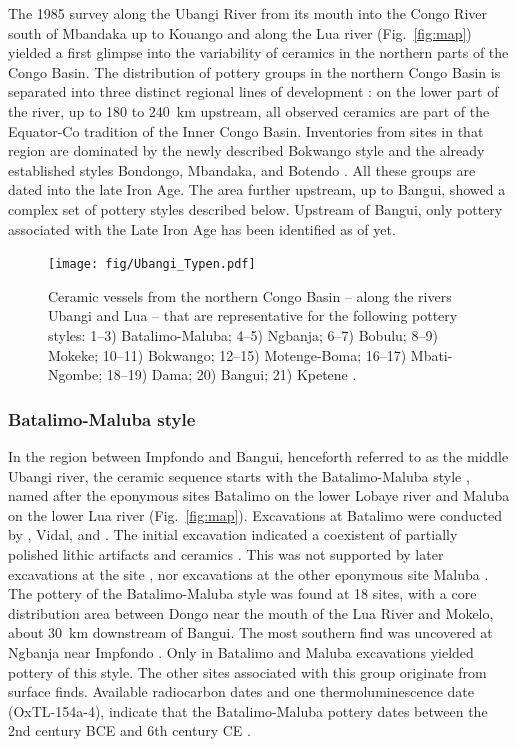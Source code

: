 \documentclass[smallextended,natbib]{svjour3}       %
\begin{document}
The 1985 survey along the Ubangi River from its mouth into the Congo River south of Mbandaka up to Kouango and along the Lua river (Fig.~\ref{fig:map}) yielded a first glimpse into the variability of ceramics in the northern parts of the Congo Basin. The distribution of pottery groups in the northern Congo Basin is separated into three distinct regional lines of development \citep[183--185]{Seidensticker.2021e}: on the lower part of the river, up to 180 to 240~km upstream, all observed ceramics are part of the Equator-Co tradition of the Inner Congo Basin. Inventories from sites in that region are dominated by the newly described Bokwango style and the already established styles Bondongo, Mbandaka, and Botendo \citep[96--98, 172--181]{Seidensticker.2021e}. All these groups are dated into the late Iron Age. The area further upstream, up to Bangui, showed a complex set of pottery styles described below. Upstream of Bangui, only pottery associated with the Late Iron Age has been identified as of yet.

\begin{figure}[!tb]
	\texttt{[image: fig/Ubangi\_Typen.pdf]}
	\caption{Ceramic vessels from the northern Congo Basin -- along the rivers Ubangi and Lua -- that are representative for the following pottery styles: 1--3) Batalimo-Maluba; 4--5) Ngbanja; 6--7) Bobulu; 8--9) Mokeke; 10--11) Bokwango; 12--15) Motenge-Boma; 16--17) Mbati-Ngombe; 18--19) Dama; 20) Bangui; 21) Kpetene \citep[75--114]{Seidensticker.2021e}.}
	\label{fig:ubangi}
\end{figure}

\subsubsection*{Batalimo-Maluba style}

In the region between Impfondo and Bangui, henceforth referred to as the middle Ubangi river, the ceramic sequence starts with the Batalimo-Maluba style \citep[75--82]{Seidensticker.2021e}, named after the eponymous sites Batalimo on the lower Lobaye river and Maluba on the lower Lua river (Fig.~\ref{fig:map}). Excavations at Batalimo were conducted by \cite{deBayledesHermens.1975}, Vidal, \cite{Kote.1992} and \cite{Ndanga.2010}. The initial excavation indicated a coexistent of partially polished lithic artifacts and ceramics \citep{Aumassip.1975}. This was not supported by later excavations at the site \citep{Ndanga.2010}, nor excavations at the other eponymous site Maluba \citep{Eggert.1987c}. The pottery of the Batalimo-Maluba style was found at 18 sites, with a core distribution area between Dongo near the mouth of the Lua River and Mokelo, about 30~km downstream of Bangui. The most southern find was uncovered at Ngbanja near Impfondo \citep[Fig.~\ref{fig:timeslices};][81 Fig.~25]{Seidensticker.2021e}. Only in Batalimo and Maluba excavations yielded pottery of this style. The other sites associated with this group originate from surface finds. Available radiocarbon dates and one thermoluminescence date (OxTL-154a-4), indicate that the Batalimo-Maluba pottery dates between the 2nd century BCE and 6th century CE \citep[Fig.~\ref{fig:bayes}; \ref{fig:chrono}; Tab.~\ref{tab:bayes};][80 Fig.~28]{Seidensticker.2021e}. 
\end{document}
